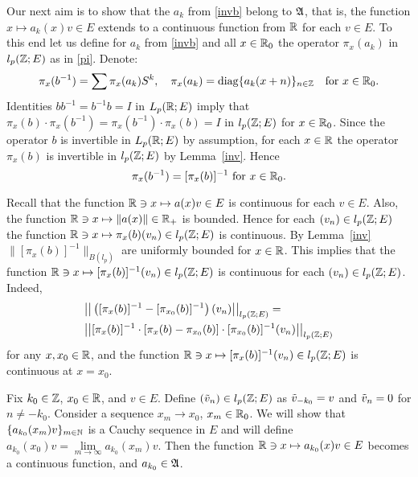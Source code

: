 \begin{pf}
Our next aim is to show that the $a_k$ from \eqref{invb} belong to
${\frak{A}}$, that is, the function
$x \mapsto a_k (x) v\in E$ extends to a continuous function from ${\Bbb{R}}$ for
each $v\in E$.  To this end let us define for $a_k$ from \eqref{invb} and
all $x\in{\Bbb{R}}_0$ the operator $\pi_x(a_k)$ in $l_p ({\Bbb{Z}};E)$ as in
\eqref{pi}.  Denote:
\begin{equation}\label{pixb}
\pi_x(b^{-1})=\sum\pi_x(a_k) S^k,\quad
\pi_x(a_k) =\operatorname{diag} \{a_k (x+n)\}_{n\in{\Bbb{Z}}} \mbox{\quad for } x\in{\Bbb{R}}_0.
\end{equation}
Identities $bb^{-1}
=b^{-1} b=I$ in $L_p({\Bbb{R}};E)$ imply that $\pi_x (b)\cdot \pi_x
(b^{-1})=\pi_x(b^{-1}) \cdot \pi_x(b) =I$ in $l_p ({\Bbb{Z}};E)$
for $x\in{\Bbb{R}}_0$.
Since the operator $b$ is invertible in $L_p({\Bbb{R}}; E)$ by assumption,
 for each $x\in{\Bbb{R}}$ the operator $\pi_x(b)$ is
invertible in $l_p({\Bbb{Z}};E)$ by Lemma~\ref{inv}.  Hence
\begin{equation}
\pi_x(b^{-1}) =[\pi_x(b)]^{-1} \mbox{ for } x\in\bbR_0.
\lb{piinv}
\end{equation}

Recall that the function
${\Bbb{R}} \ni x \mapsto a(x) v\in E$ is continuous for each $v\in
E$.  Also, the function ${\Bbb{R}}\ni x\mapsto \|a(x)\|\in {\Bbb{R}}_+$
is bounded. Hence for each
$(v_n) \in l_p ({\Bbb{Z}};E)$ the function ${\Bbb{R}} \ni x \mapsto
\pi_x(b)(v_n) \in l_p ({\Bbb{Z}};E)$ is continuous.  By Lemma~\ref{inv}
$\|[ \pi_x (b) ]^{-1}\|_{B(l_p)}$ are uniformly bounded for $x\in{\Bbb{R}}$.
This implies that the function
${\Bbb{R}} \ni x \mapsto [\pi_x(b)]^{-1} (v_n) \in l_p ({\Bbb{Z}};E)$
is continuous for each $(v_n ) \in l_p ({\Bbb{Z}};E)$.
Indeed,
\begin{align*}
& \big|\big| \left([\pi_x(b)]^{-1}-[\pi_{x_0}(b)]^{-1}\right)
(v_n)\big|\big|_{l_p({\Bbb{Z}};E)} = \\
& \big|\big| [\pi_x(b)]^{-1}\cdot
\left[\pi_x(b)-\pi_{x_0}(b)\right]\cdot
[\pi_{x_0}(b)]^{-1}
(v_n)\big|\big|_{l_p({\Bbb{Z}};E)}
\end{align*}
for any $x,x_0 \in{\Bbb{R}}$, and the function
${\Bbb{R}} \ni x \mapsto [\pi_x(b)]^{-1} (v_n) \in l_p ({\Bbb{Z}};E)$
is continuous at $x=x_0$.

Fix $k_0 \in {\Bbb{Z}}$, $x_0 \in {\Bbb{R}}$, and $v\in E$.  Define $(\tilde v_n) \in
l_p ({\Bbb{Z}};E)$ as $\tilde v_{-k_0} =v$ and $\tilde v_n =0$ for $n\neq -k_0$.
Consider a sequence $x_m \to x_0$, $x_m \in{\Bbb{R}}_0$.  We will show that
$\{a_{k_0} (x_m) v\}_{m\in{\Bbb{N}}}$ is a Cauchy sequence in $E$ and will
define $a_{k_0} (x_0) v=\lim\limits_{m\to\infty} a_{k_0} (x_m) v$.  Then
the function
${\Bbb{R}} \ni x \mapsto a_{k_0} (x) v\in E$ becomes a continuous function,
and $a_{k_0}\in{\frak{A}}$.


\end{pf}
